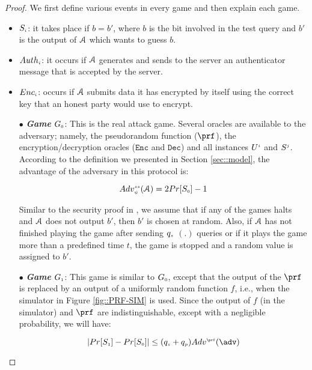 \begin{proof}
We first define various events in every game and then explain each game. 

\begin{itemize}
%
\item  $S_{\scriptscriptstyle  i}$: it takes place if $b=b'$, where $b$ is the bit involved in the test query and $b'$ is the output of $\mathcal{A}$ which wants to guess $b$. 
%
\item $Auth_{\scriptscriptstyle  i}$: it occurs if $\mathcal{A}$ generates and sends to the server an authenticator message that is accepted by the server.
%
\item $Enc_{\scriptscriptstyle  i}$: occurs if $\mathcal{A}$ submits data it has encrypted by itself using the correct key that an honest party would use to encrypt. 
%
\end{itemize}

\begin{itemize}
%
\item[$\bullet$] \textit{\textbf{Game}} $G_{\scriptscriptstyle  0}$: This is the real attack game. Several oracles are  available to the adversary; namely, the pseudorandom function ($\prf$),  the encryption/decryption oracles ($\mathtt{Enc}$ and $\mathtt{Dec}$) and all instances $U^{\scriptscriptstyle  i}$ and $S^{\scriptscriptstyle  j}$.
%
According to the definition we presented in Section \ref{sec::model}, the advantage of the adversary in this protocol is: 

\begin{equation}\label{eq::adv-ake-}
Adv_{\scriptscriptstyle  \psi}^{\scriptscriptstyle  ss}(\mathcal{A})=2Pr[S_{\scriptscriptstyle  0}]-1
\end{equation}

Similar to the security proof in \cite{BressonCP03}, we assume that if any of the games halts and $\mathcal{A}$ does not output $b'$, then $b'$  is chosen at random. Also, if $\mathcal{A}$ has not finished playing the game after sending $q_{\scriptscriptstyle  s}$  \send$(.)$ queries or if it plays the game more than a predefined time $t$, the game is stopped and a random value is assigned to $b'$. 
%



\item[$\bullet$] \textit{\textbf{Game}}  $G_{\scriptscriptstyle  1}$: This game is similar to  $G_{\scriptscriptstyle  0}$, except that the output of the $\prf$ is replaced by an output of  a uniformly random function $f$, i.e., when the simulator in Figure \ref{fig::PRF-SIM} is used. Since the output of $f$ (in the simulator) and $\prf$ are indistinguishable, except with a negligible probability, we will have: 

\begin{equation}\label{eq::game_1}
|Pr[S_{\sss  1}]-Pr[S_{\sss  0}]|\leq (q_{\sss s}+q_{\sss p})Adv^{\sss\prf}(\adv)
\end{equation}


\end{itemize}
\end{proof}
